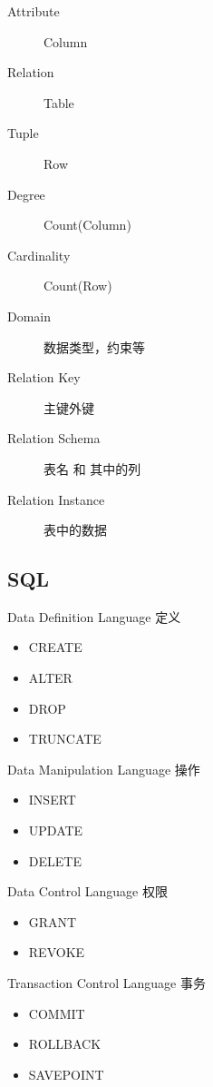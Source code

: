 \documentclass[11pt,journal,compsoc]{IEEEtran}
\begin{document}
\begin{description}
    \item[Attribute] Column
    \item[Relation] Table
    \item[Tuple] Row
    \item[Degree] Count(Column)
    \item[Cardinality] Count(Row)
    \item[Domain] 数据类型，约束等
    \item[Relation Key] 主键外键
    \item[Relation Schema] 表名 和 其中的列
    \item[Relation Instance] 表中的数据
\end{description}


\subsection{SQL}

Data Definition Language 定义

\begin{itemize}
    \item CREATE
    \item ALTER
    \item DROP
    \item TRUNCATE
\end{itemize}

Data Manipulation Language 操作

\begin{itemize}
    \item INSERT
    \item UPDATE
    \item DELETE
\end{itemize}

Data Control Language 权限

\begin{itemize}
    \item GRANT
    \item REVOKE
\end{itemize}

Transaction Control Language 事务

\begin{itemize}
    \item COMMIT
    \item ROLLBACK
    \item SAVEPOINT
\end{itemize}
\end{document}
